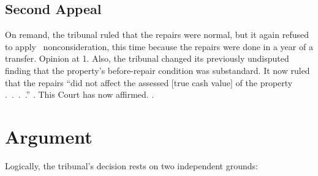 \documentclass[12pt,\documentclassflag]{michiganCourtOfAppealsBrief}
\begin{document}

\subsection{Second Appeal}

On remand, the tribunal ruled that the repairs were normal, but it again refused to apply \mathieuGast\ nonconsideration, this time because
the repairs were done in a year of a transfer. Opinion at 1. Also, the tribunal changed its previously undisputed finding that the property's before-repair condition was substandard. It now ruled that the repairs ``did not affect the assessed [true cash value] of the property .~.~.~.'' \Id. This Court has now affirmed. \Id.

\section{Argument}

Logically, the tribunal's decision rests on two independent grounds:
\end{document}
